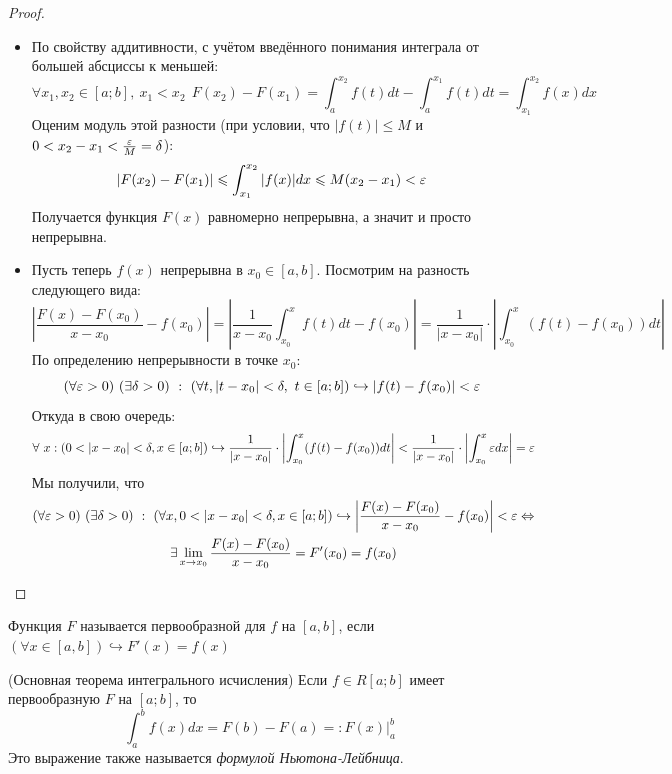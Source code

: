 \begin{proof}~
	\begin{itemize}
		\item По свойству аддитивности, с учётом введённого понимания интеграла от большей абсциссы к меньшей:
		\[
			\forall x_1, x_2 \in [a; b],\ x_1 < x_2\ \ F(x_2) - F(x_1) = \int_a^{x_2} f(t)dt - \int_a^{x_1} f(t)dt= \int_{x_1}^{x_2} f(x)dx
		\]
		Оценим модуль этой разности (при условии, что $|f(t)| \le M$ и $0 < x_2 - x_1 < \frac{\varepsilon}{M} = \delta$):
		\[
			|F(x_2) - F(x_1)| \leqslant \int_{x_1}^{x_2} |f(x)|dx \leqslant M(x_2 - x_1) < \varepsilon
		\]
		Получается функция $F(x)$ равномерно непрерывна, а значит и просто непрерывна.
		
		\item Пусть теперь $f(x)$ непрерывна в $x_0\in[a,b]$. Посмотрим на разность следующего вида:
		\[
			\left|\frac{F(x) - F(x_0)}{x - x_0} - f(x_0)\right| = \left|\frac{1}{x - x_0} \int_{x_0}^x f(t)dt - f(x_0)\right| = \frac{1}{|x - x_0|} \cdot \left|\int_{x_0}^x (f(t) - f(x_0))dt\right|
		\]
		По определению непрерывности в точке $x_0$:
		\[
			(\forall \varepsilon > 0)\ (\exists \delta > 0)\ :\ (\forall t, |t - x_0| < \delta,\ t \in [a;b]) \hookrightarrow |f(t) - f(x_0)| < \varepsilon
		\]
		Откуда в свою очередь:
		\[
			\forall\ x : (0 < |x - x_0| < \delta, x \in [a; b]) \hookrightarrow \frac{1}{|x - x_0|} \cdot \left|\int_{x_0}^x (f(t) - f(x_0))dt\right| < \frac{1}{|x - x_0|} \cdot \left|\int_{x_0}^x \varepsilon dx\right|  = \varepsilon
		\]
		Мы получили, что 
		\begin{multline*}
			(\forall \varepsilon > 0)\ (\exists \delta > 0)\ :\ (\forall x, 0 < |x - x_0| < \delta, x \in [a; b]) \hookrightarrow \left|\frac{F(x) - F(x_0)}{x - x_0} - f(x_0)\right| < \varepsilon \Leftrightarrow
			\\
			\exists \lim\limits_{x \to x_0} \frac{F(x) - F(x_0)}{x - x_0} = F'(x_0) = f(x_0)
		\end{multline*}
	\end{itemize}
\end{proof}

\begin{reminder}
	Функция $F$ называется первообразной для $f$ на $[a,b]$, если $(\forall x\in[a,b])\hookrightarrow F'(x)=f(x)$
\end{reminder}

\begin{theorem} (Основная теорема интегрального исчисления)
	Если $f \in R[a; b]$ имеет первообразную $F$ на $[a; b]$, то
	\[
		\int_a^b f(x)dx = F(b) - F(a) =: F(x)\Big|_a^b
	\]
	Это выражение также называется \textit{формулой Ньютона-Лейбница}.
\end{theorem}

